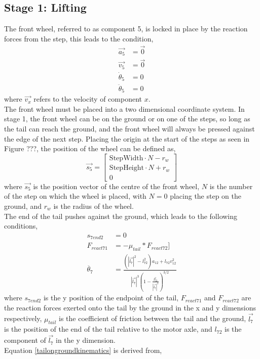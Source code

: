 \subsection*{Stage 1: Lifting}
The front wheel, referred to as component 5, is locked in place by the reaction forces from the step, this leads to the condition,
\begin{subequations}
	\label{wheel1locked}
	\begin{align}
		\vec{a_5} &= \vec{0}\\
		\vec{v_5} &= \vec{0}\\
		\dot{\theta}_5 &= 0\\
		\ddot{\theta}_5 &= 0
	\end{align}
\end{subequations}
where $\vec{v_x}$ refers to the velocity of component $x$.\\
The front wheel must be placed into a two dimensional coordinate system. In stage 1, the front wheel can be on the ground or on one of the steps, so long as the tail can reach the ground, and the front wheel will always be pressed against the edge of the next step. Placing the origin at the start of the steps as seen in Figure ???, the position of the wheel can be defined as,
\begin{equation}
	\vec{s_5}
	=
	\begin{bmatrix}
		\mathrm{StepWidth}\cdot N-r_w\\
		\mathrm{StepHeight}\cdot N+r_w\\
		0
	\end{bmatrix}
\end{equation}
where $\vec{s_5}$ is the position vector of the centre of the front wheel, $N$ is the number of the step on which the wheel is placed, with $N = 0$ placing the step on the ground, and $r_w$ is the radius of the wheel.\\
The end of the tail pushes against the ground, which leads to the following conditions,
\begin{subequations}
	\label{tailonground}
	\begin{align}
		s_{7end2} &= 0\\
		F_{react71} &=  -\mu_{tail}*F_{react72}]\\
		\ddot{\theta_7} &= \frac{(|\vec{l_7}|^2 - l_{72}^2)a_{12} + l_{72}v_{12}^2}{|\vec{l_7}|^3 (1 - \frac{l_{72}^2}{|\vec{l_7}|^2})^{3/2}} \label{tailongroundkinematics}
	\end{align}
\end{subequations}
where $s_{7end2}$ is the y position of the endpoint of the tail, $F_{react71}$ and $F_{react72}$ are the reaction forces exerted onto the tail by the ground in the x and y dimensions respectively, $\mu_{tail}$ is the coefficient of friction between the tail and the ground, $\vec{l_7}$ is the position of the end of the tail relative to the motor axle, and $l_{72}$ is the component of $\vec{l_7}$ in the y dimension. \\
Equation \ref{tailongroundkinematics} is derived from,

